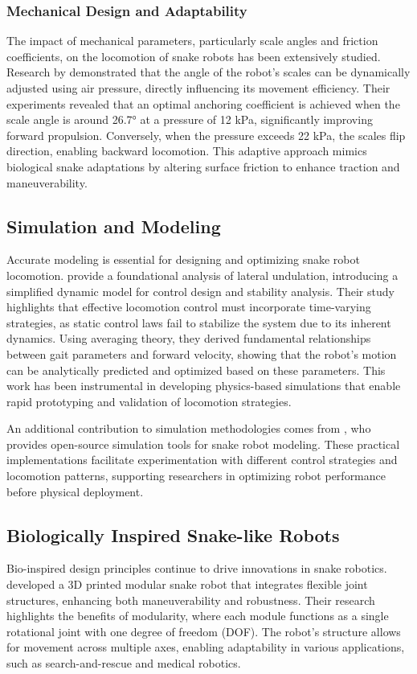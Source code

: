 \documentclass[12pt,a4paper]{report}
\begin{document}
\subsubsection{Mechanical Design and Adaptability}
The impact of mechanical parameters, particularly scale angles and friction coefficients, on the locomotion of snake robots has been extensively studied. Research by \textcite{shen-2021} demonstrated that the angle of the robot’s scales can be dynamically adjusted using air pressure, directly influencing its movement efficiency. Their experiments revealed that an optimal anchoring coefficient is achieved when the scale angle is around 26.7° at a pressure of 12 kPa, significantly improving forward propulsion. Conversely, when the pressure exceeds 22 kPa, the scales flip direction, enabling backward locomotion. This adaptive approach mimics biological snake adaptations by altering surface friction to enhance traction and maneuverability.

\subsection{Simulation and Modeling}
Accurate modeling is essential for designing and optimizing snake robot locomotion. \textcite{liljeback-2013} provide a foundational analysis of lateral undulation, introducing a simplified dynamic model for control design and stability analysis. Their study highlights that effective locomotion control must incorporate time-varying strategies, as static control laws fail to stabilize the system due to its inherent dynamics. Using averaging theory, they derived fundamental relationships between gait parameters and forward velocity, showing that the robot’s motion can be analytically predicted and optimized based on these parameters. This work has been instrumental in developing physics-based simulations that enable rapid prototyping and validation of locomotion strategies.

An additional contribution to simulation methodologies comes from \textcite{yogesh2023snake}, who provides open-source simulation tools for snake robot modeling. These practical implementations facilitate experimentation with different control strategies and locomotion patterns, supporting researchers in optimizing robot performance before physical deployment.

\subsection{Biologically Inspired Snake-like Robots}
Bio-inspired design principles continue to drive innovations in snake robotics. \textcite{Mohammed2016} developed a 3D printed modular snake robot that integrates flexible joint structures, enhancing both maneuverability and robustness. Their research highlights the benefits of modularity, where each module functions as a single rotational joint with one degree of freedom (DOF). The robot's structure allows for movement across multiple axes, enabling adaptability in various applications, such as search-and-rescue and medical robotics.
\end{document}
